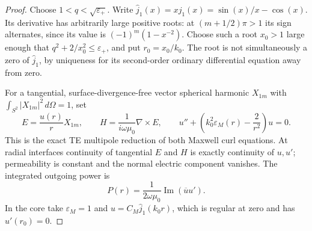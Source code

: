 \begin{proof}
Choose $1<q<\sqrt{\varepsilon_+}$. Write
$\widehat j_1(x)=xj_1(x)=\sin(x)/x-\cos(x)$. Its derivative has arbitrarily
large positive roots: at $(m+1/2)\pi>1$ its sign alternates, since its value
is $(-1)^m(1-x^{-2})$. Choose such a root $x_0>1$ large enough that
$q^2+2/x_0^2\leq\varepsilon_+$, and put $r_0=x_0/k_0$.
The root is not simultaneously a zero of $\widehat j_1$, by uniqueness for
its second-order ordinary differential equation away from zero.

For a tangential, surface-divergence-free vector spherical harmonic
$X_{1m}$ with $\int_{S^2}|X_{1m}|^2\,d\Omega=1$, set
\begin{equation}
 E=\frac{u(r)}r X_{1m},\qquad
 H=\frac1{i\omega\mu_0}\nabla\times E,
 \qquad
 u''+\left(k_0^2\varepsilon_M(r)-\frac2{r^2}\right)u=0.
 \label{cx:radial-maxwell}
\end{equation}
This is the exact TE multipole reduction of both Maxwell curl equations.
At radial interfaces continuity of tangential $E$ and $H$ is exactly
continuity of $u,u'$; permeability is constant and the normal electric
component vanishes. The integrated outgoing power is
\begin{equation}
 P(r)=\frac1{2\omega\mu_0}\operatorname{Im}(\overline u u').
 \label{cx:radial-power}
\end{equation}
In the core take $\varepsilon_M=1$ and
$u=C_M\widehat j_1(k_0r)$, which is regular at zero and has $u'(r_0)=0$.


\end{proof}
